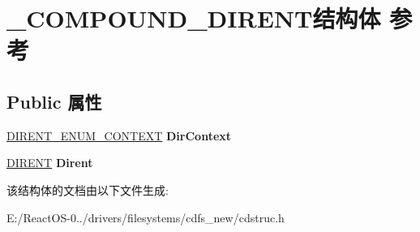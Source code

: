 \hypertarget{struct___c_o_m_p_o_u_n_d___d_i_r_e_n_t}{}\section{\+\_\+\+C\+O\+M\+P\+O\+U\+N\+D\+\_\+\+D\+I\+R\+E\+N\+T结构体 参考}
\label{struct___c_o_m_p_o_u_n_d___d_i_r_e_n_t}
\subsection*{Public 属性}
\begin{DoxyCompactItemize}
\item 
\mbox{\label{struct___c_o_m_p_o_u_n_d___d_i_r_e_n_t_a3e068fb226513295d862a75b66d18da5}} 
\hyperlink{struct___d_i_r_e_n_t___e_n_u_m___c_o_n_t_e_x_t}{D\+I\+R\+E\+N\+T\+\_\+\+E\+N\+U\+M\+\_\+\+C\+O\+N\+T\+E\+XT} {\bfseries Dir\+Context}
\item 
\mbox{\label{struct___c_o_m_p_o_u_n_d___d_i_r_e_n_t_a6f372003c9b475dd1a834a9cce16ffd3}} 
\hyperlink{struct___d_i_r_e_n_t}{D\+I\+R\+E\+NT} {\bfseries Dirent}
\end{DoxyCompactItemize}


该结构体的文档由以下文件生成\+:\begin{DoxyCompactItemize}
\item 
E\+:/\+React\+O\+S-\/0../drivers/filesystems/cdfs\+\_\+new/cdstruc.\+h\end{DoxyCompactItemize}
